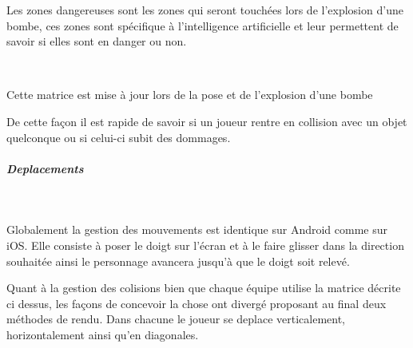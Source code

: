 			Les zones dangereuses sont les zones qui seront touchées lors de l'explosion
			d'une bombe, ces zones sont spécifique à l'intelligence artificielle et leur
			permettent de savoir si elles sont en danger ou non.
			
			
			$\,$
			
			Cette matrice est mise à jour lors de la pose et de l'explosion d'une bombe
			
			De cette façon il est rapide de savoir si un joueur rentre en collision avec
			un objet quelconque ou si celui-ci subit des dommages.
		

			\subparagraph{Deplacements\\}
			
				$\,$
			
				Globalement la gestion des mouvements est identique sur Android comme sur
				iOS.
				Elle consiste à poser le doigt sur l'écran et à le faire glisser dans la
				direction souhaitée ainsi le personnage avancera jusqu'à que le doigt soit
				relevé.				
				
				Quant à la gestion des colisions bien que chaque équipe utilise la matrice
				décrite ci dessus, les façons de concevoir la chose ont divergé proposant au
				final deux méthodes de rendu.
				Dans chacune le joueur se deplace verticalement, horizontalement ainsi qu'en
				diagonales.
				
